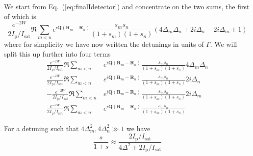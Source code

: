 \documentclass[11pt,letter]{article}
\newcommand{\bv}[1]{\ensuremath{\bm{#1}}}
\newcommand{\iisat}{\ensuremath{I_{\mathrm{p}}/I_{\mathrm{sat}}}}
\begin{document}
We start from Eq.~(\ref{eq:finalIdetector}) and concentrate on the two sums,
the first of which is 
\begin{equation} 
  \frac{  e^{-2W}}{2\iisat} \Re 
  \sum_{m<n} 
               e^{ i \bv{Q}( \bv{R}_{m} - \bv{R}_{n} ) } 
    \frac{ s_{m} s_{n} } {( 1+s_{m} )( 1+s_{n} ) }
    \left(
         4\Delta_{m} \Delta_{n} 
      + 2i \Delta_{n} 
      - 2i \Delta_{m}
      + 1
    \right)  
\end{equation}
where for simplicity we have now written the detunings in units of $\Gamma$.
We will split this up further into four terms 
\begin{align} 
  \frac{  e^{-2W}}{2\iisat} \Re \sum_{m<n} & 
      e^{ i \bv{Q}( \bv{R}_{m} - \bv{R}_{n} ) } 
      \frac{ s_{m} s_{n} } {( 1+s_{m} )( 1+s_{n} ) } 4 \Delta_{m} \Delta_{n} \\
  \frac{  e^{-2W}}{2\iisat} \Re \sum_{m<n} & 
      e^{ i \bv{Q}( \bv{R}_{m} - \bv{R}_{n} ) } 
      \frac{ s_{m} s_{n} } {( 1+s_{m} )( 1+s_{n} ) } 2 i \Delta_{n}  \\
  -\frac{  e^{-2W}}{2\iisat} \Re \sum_{m<n} & 
      e^{ i \bv{Q}( \bv{R}_{m} - \bv{R}_{n} ) } 
      \frac{ s_{m} s_{n} } {( 1+s_{m} )( 1+s_{n} ) } 2 i \Delta_{m}  \\
  \frac{  e^{-2W}}{2\iisat} \Re \sum_{m<n} & 
      e^{ i \bv{Q}( \bv{R}_{m} - \bv{R}_{n} ) } 
      \frac{ s_{m} s_{n} } {( 1+s_{m} )( 1+s_{n} ) }   
\end{align}

For a detuning such that $4\Delta_{m}^{2}, 4\Delta_{n}^{2} \gg 1 $ we have
\begin{equation}
  \frac{s}{1+s} \approx \frac{2 \iisat }
                             { 4 \Delta^{2} + 2 \iisat }
\end{equation}
\end{document}
